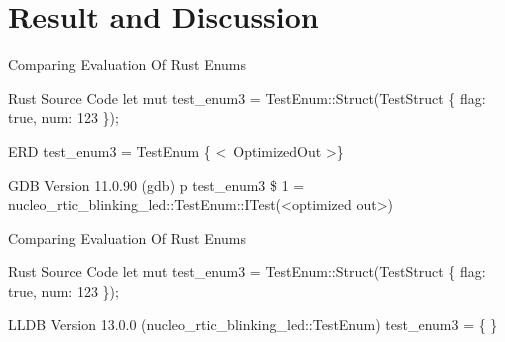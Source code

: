 \section{Result and Discussion}

\begin{frame}{Comparing Evaluation Of Rust Enums}
	\begin{alertblock}{Rust Source Code}
		let mut test\_enum3 = TestEnum::Struct(TestStruct \{ flag: true, num: 123 \});
    	\end{alertblock}

	\begin{block}{ERD}
		test\_enum3 = TestEnum \{ \textless \ OptimizedOut \textgreater \}
    	\end{block}

    	\begin{block}{GDB Version 11.0.90}
		(gdb) p test\_enum3\newline
		\$ 1 = nucleo\_rtic\_blinking\_led::TestEnum::ITest(\textless optimized out\textgreater)
    	\end{block}
\end{frame}


\begin{frame}{Comparing Evaluation Of Rust Enums}
	
	\begin{alertblock}{Rust Source Code}
		let mut test\_enum3 = TestEnum::Struct(TestStruct \{ flag: true, num: 123 \});
    	\end{alertblock}

    	\begin{block}{LLDB Version 13.0.0}
		(nucleo\_rtic\_blinking\_led::TestEnum) test\_enum3 = \{\newline
		\newline
		\newline
		\newline
		\newline
		\text{\ \ \}}\newline
		\newline
		\newline
		\}
    	\end{block}

\end{frame}

